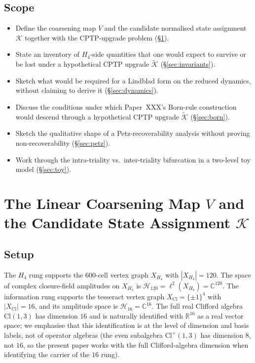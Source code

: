 \documentclass[12pt]{article}
\theoremstyle{definition}
\theoremstyle{remark}
\newcommand{\Cl}{\mathrm{Cl}}
\newcommand{\Hcal}{\mathcal{H}}
\newcommand{\Kcal}{\mathcal{K}}
\begin{document}
\subsection{Scope}
\begin{itemize}
\item Define the coarsening map $V$ and the candidate normalised state assignment $\Kcal$ together with the CPTP-upgrade problem (\S\ref{sec:K}).
\item State an inventory of $H_4$-side quantities that one would expect to survive or be lost under a hypothetical CPTP upgrade $\widetilde{\Kcal}$ (\S\ref{sec:invariants}).
\item Sketch what would be required for a Lindblad form on the reduced dynamics, without claiming to derive it (\S\ref{sec:dynamics}).
\item Discuss the conditions under which Paper~XXX's Born-rule construction would descend through a hypothetical CPTP upgrade $\widetilde{\Kcal}$ (\S\ref{sec:born}).
\item Sketch the qualitative shape of a Petz-recoverability analysis without proving non-recoverability (\S\ref{sec:petz}).
\item Work through the intra-triality vs.\ inter-triality bifurcation in a two-level toy model (\S\ref{sec:toy}).
\end{itemize}

\section{The Linear Coarsening Map $V$ and the Candidate State Assignment $\Kcal$}\label{sec:K}

\subsection{Setup}

The $H_4$ rung supports the 600-cell vertex graph $X_{H_4}$ with $|X_{H_4}| = 120$. The space of complex closure-field amplitudes on $X_{H_4}$ is $\Hcal_{120} = \ell^2(X_{H_4}) = \mathbb{C}^{120}$. The information rung supports the tesseract vertex graph $X_{\Cl} = \{\pm 1\}^4$ with $|X_{\Cl}| = 16$, and its amplitude space is $\Hcal_{16} = \mathbb{C}^{16}$. The full real Clifford algebra $\Cl(1,3)$ has dimension $16$ and is naturally identified with $\mathbb{R}^{16}$ as a real vector space; we emphasise that this identification is at the level of dimension and basis labels, not of operator algebras (the even subalgebra $\Cl^+(1,3)$ has dimension $8$, not $16$, so the present paper works with the full Clifford-algebra dimension when identifying the carrier of the $16$ rung).
\end{document}
